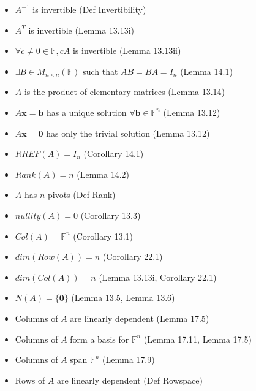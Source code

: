 \documentclass[11pt,notitlepage]{report}
\newcommand{\bb}[1]{\ensuremath{\mathbb{#1}}}
\newcommand{\tbf}[1]{\textbf{#1}}
\begin{document}
\begin{multicols}{2}\begin{itemize}\setcounter{enumi}{0}
    \item $A^{-1}$ is invertible (Def Invertibility)
    \item $A^T$ is invertible (Lemma 13.13i)
\end{itemize}\end{multicols}\vspace{-0.75cm}\begin{itemize}
    \item $\forall c \ne 0 \in \bb F, cA$ is invertible (Lemma 13.13ii)
    \item $\exists B \in M_{n \times n} (\bb F)$ such that $AB = BA = I_n$ (Lemma 14.1)
    \item $A$ is the product of elementary matrices (Lemma 13.14)
    \item $A\tbf x = \tbf b$ has a unique solution $\forall \tbf b \in \bb F^n$ (Lemma 13.12)
    \item $A\tbf x = \tbf 0$ has only the trivial solution (Lemma 13.12)
\end{itemize}\vspace{-0.5cm}\begin{multicols}{2}\begin{itemize}
    \item $RREF(A) = I_n$ (Corollary 14.1)
    \item $Rank(A) = n$ (Lemma 14.2)
    \item $A$ has $n$ pivots (Def Rank)
    \item $nullity(A) = 0$ (Corollary 13.3)
    \item $Col(A) = \bb F^n$ (Corollary 13.1)
    \item $dim(Row(A)) = n$ (Corollary 22.1)
\end{itemize}\end{multicols}\vspace{-0.75cm}\begin{itemize}
    \item $dim(Col(A)) = n$ (Lemma 13.13i, Corollary 22.1)
    \item $N(A) = \{\tbf 0\}$ (Lemma 13.5, Lemma 13.6)
    \item Columns of $A$ are linearly dependent (Lemma 17.5)
    \item Columns of $A$ form a basis for $\bb F^n$ (Lemma 17.11, Lemma 17.5)
    \item Columns of $A$ span $\bb F^n$ (Lemma 17.9)
    \item Rows of $A$ are linearly dependent (Def Rowspace)

\end{itemize}
\end{document}
